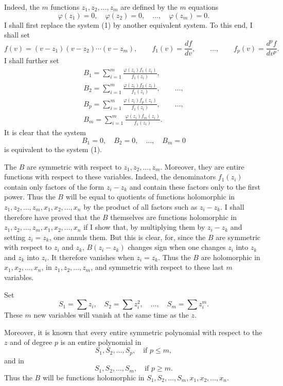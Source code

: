 \documentclass[11pt]{article}
\begin{document}
Indeed, the $m$ functions $z_1,z_2,\ldots,z_m$ are defined by the $m$ equations
\begin{equation*}\tag{1}
\varphi(z_1)=0,
\quad \varphi(z_2)=0,
\quad \ldots,
\quad \varphi(z_m)=0.
\end{equation*}
I shall first replace the system (1) by another equivalent system. To this end, I shall set
\[
f(v)=(v-z_1)(v-z_2)\cdots(v-z_m),
\qquad
f_1(v)=\frac{df}{dv},
\qquad \ldots,
\qquad
f_p(v)=\frac{d^p f}{dv^p}.
\]
I shall further set
\[
\begin{gathered}
B_1=\sum_{i=1}^m \frac{\varphi(z_i)f_1(z_i)}{f_1(z_i)},\\
B_2=\sum_{i=1}^m \frac{\varphi(z_i)f_2(z_i)}{f_1(z_i)},\qquad \ldots,\\
B_p=\sum_{i=1}^m \frac{\varphi(z_i)f_p(z_i)}{f_1(z_i)},\qquad \ldots,\\
B_m=\sum_{i=1}^m \frac{\varphi(z_i)f_m(z_i)}{f_1(z_i)}.
\end{gathered}
\]
It is clear that the system
\begin{equation*}\tag{2}
B_1=0,
\quad B_2=0,
\quad \ldots,
\quad B_m=0
\end{equation*}
is equivalent to the system (1).

The $B$ are symmetric with respect to $z_1,z_2,\ldots,z_m$. Moreover, they are entire functions with respect to these variables. Indeed, the denominators $f_1(z_i)$ contain only factors of the form $z_i-z_k$ and contain these factors only to the first power. Thus the $B$ will be equal to quotients of functions holomorphic in $z_1,z_2,\ldots,z_m,x_1,x_2,\ldots,x_n$ by the product of all factors such as $z_i-z_k$. I shall therefore have proved that the $B$ themselves are functions holomorphic in $z_1,z_2,\ldots,z_m,x_1,x_2,\ldots,x_n$ if I show that, by multiplying them by $z_i-z_k$ and setting $z_i=z_k$, one annuls them. But this is clear, for, since the $B$ are symmetric with respect to $z_i$ and $z_k$, $B(z_i-z_k)$ changes sign when one changes $z_i$ into $z_k$ and $z_k$ into $z_i$. It therefore vanishes when $z_i=z_k$. Thus the $B$ are holomorphic in $x_1,x_2,\ldots,x_n$, in $z_1,z_2,\ldots,z_m$, and symmetric with respect to these last $m$ variables.

Set
\[
S_1=\sum z_i,
\quad S_2=\sum z_i^2,
\quad \ldots,
\quad S_m=\sum z_i^m.
\]
These $m$ new variables will vanish at the same time as the $z$.

Moreover, it is known that every entire symmetric polynomial with respect to the $z$ and of degree $p$ is an entire polynomial in
\[
S_1,S_2,\ldots,S_p,\quad \text{if }p\le m,
\]
and in
\[
S_1,S_2,\ldots,S_m,
\quad \text{if }p\ge m.
\]
Thus the $B$ will be functions holomorphic in $S_1,S_2,\ldots,S_m,x_1,x_2,\ldots,x_n$.
\end{document}
